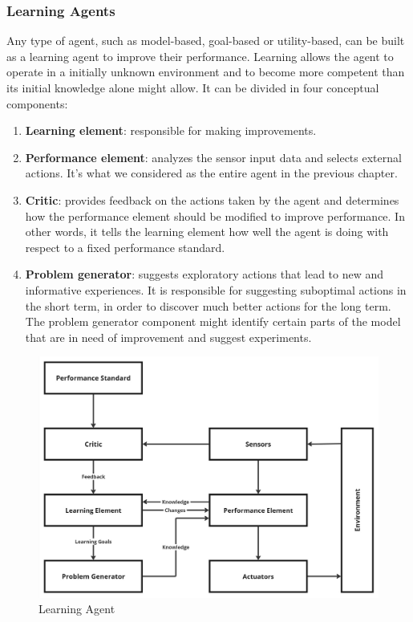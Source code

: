 \documentclass{article}
\begin{document}
\subsubsection{Learning Agents}
Any type of agent, such as model-based, goal-based or utility-based, can be built as a learning agent to improve their performance. Learning allows the agent to operate in a initially unknown environment and to become more competent than its initial knowledge alone might allow. It can be divided in four conceptual components:
\begin{enumerate}
    \item \textbf{Learning element}: responsible for making improvements.
    \item \textbf{Performance element}: analyzes the sensor input data and selects external actions. It's what we considered as the entire agent in the previous chapter.
    \item \textbf{Critic}: provides feedback on the actions taken by the agent and determines how the performance element should be modified to improve performance. In other words, it tells the learning element how well the agent is doing with respect to a fixed performance standard. 
    \item \textbf{Problem generator}: suggests exploratory actions that lead to new and informative experiences. It is responsible for suggesting suboptimal actions in the short term, in order to discover much better actions for the long term. The problem generator component might identify certain parts of the model that are in need of improvement and suggest experiments.
\end{enumerate}

\begin{figure}[h]
    \centering
    \includegraphics[width=0.5\linewidth]{images/Learning Agent.jpg}
    \caption{Learning Agent}
    \label{fig:learning_agent}
\end{figure}
\end{document}
